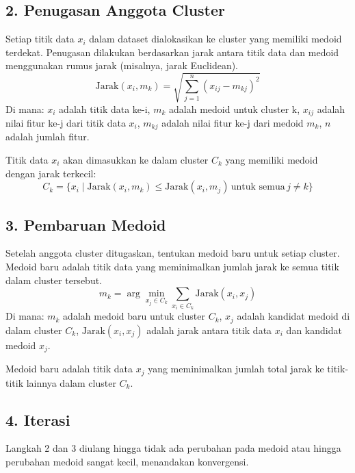 \documentclass[
  oneside]{book}
\begin{document}
\subsection*{2. Penugasan Anggota Cluster}\label{penugasan-anggota-cluster}

Setiap titik data \(x_i\) dalam dataset dialokasikan ke cluster yang memiliki medoid terdekat. Penugasan dilakukan berdasarkan jarak antara titik data dan medoid menggunakan rumus jarak (misalnya, jarak Euclidean).
\[
   \text{Jarak}(x_i, m_k) = \sqrt{\sum_{j=1}^n (x_{ij} - m_{kj})^2}
   \]
Di mana:
\(x_i\) adalah titik data ke-i, \(m_k\) adalah medoid untuk cluster k, \(x_{ij}\) adalah nilai fitur ke-j dari titik data \(x_i\), \(m_{kj}\) adalah nilai fitur ke-j dari medoid \(m_k\), \(n\) adalah jumlah fitur.

Titik data \(x_i\) akan dimasukkan ke dalam cluster \(C_k\) yang memiliki medoid dengan jarak terkecil:
\[
   C_k = \{ x_i \mid \text{Jarak}(x_i, m_k) \leq \text{Jarak}(x_i, m_j) \, \text{untuk semua} \, j \neq k \}
   \]

\subsection*{3. Pembaruan Medoid}\label{pembaruan-medoid}

Setelah anggota cluster ditugaskan, tentukan medoid baru untuk setiap cluster. Medoid baru adalah titik data yang meminimalkan jumlah jarak ke semua titik dalam cluster tersebut.
\[
   m_k = \arg\min_{x_j \in C_k} \sum_{x_i \in C_k} \text{Jarak}(x_i, x_j)
   \]
Di mana: \(m_k\) adalah medoid baru untuk cluster \(C_k\), \(x_j\) adalah kandidat medoid di dalam cluster \(C_k\), \(\text{Jarak}(x_i, x_j)\) adalah jarak antara titik data \(x_i\) dan kandidat medoid \(x_j\).

Medoid baru adalah titik data \(x_j\) yang meminimalkan jumlah total jarak ke titik-titik lainnya dalam cluster \(C_k\).

\subsection*{4. Iterasi}\label{iterasi}

Langkah 2 dan 3 diulang hingga tidak ada perubahan pada medoid atau hingga perubahan medoid sangat kecil, menandakan konvergensi.
\end{document}
